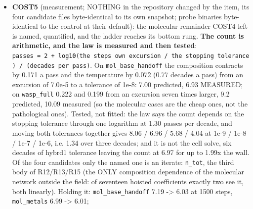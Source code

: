 \documentclass[english,a4paper]{my_memo}
\begin{document}
\begin{itemize}
{  remainder, now open item 1}: on \texttt{mol\_base\_handoff} the ladder is flat
  (freezing the field RAISES the count 7.19 -\textgreater{} 7.41) and everything the item
  could reach accounts for 0.6 of its 7.19 passes; the named candidate, READ
  and not measured, is \texttt{n\_tot}, the third-body density of the three-body
  molecular reactions, built by \texttt{calc\_ntot} from the ENTRY composition, and
  with it the H2 vibrational quench fraction and bound energy. Also
  recorded: \texttt{xuv\_field\_block\_cells} and \texttt{xuv\_self\_field\_passes} are
  compile-time parameters, so measuring the two together needs a rebuild;
  \texttt{heating\_of\_composition} calls \texttt{he\_rec\_coupling} a second time whole-grid
  every pass for its heating alone (both calls together bounded at 1.7
  percent of wall); on \texttt{mol\_base\_handoff} the He recombination coupling is
  what keeps step 0 inside the pass cap.
\item
  \textbf{COST5} (measurement; NOTHING in the repository changed by the item, its
  four candidate files byte-identical to its own snapshot; probe binaries
  byte-identical to the control at their default): the molecular remainder
  COST4 left is named, quantified, and the ladder reaches its bottom rung.
  \textbf{The count is arithmetic, and the law is measured and then tested}:
  \texttt{passes\ =\ 2\ +\ log10(the\ step\textquotesingle{}s\ own\ excursion\ /\ the\ stopping\ tolerance)\ /\ (decades\ per\ pass)}. On \texttt{mol\_base\_handoff} the composition contracts by
  0.171 a pass and the temperature by 0.072 (0.77 decades a pass) from an
  excursion of 7.0e-5 to a tolerance of 1e-8: 7.00 predicted, 6.93 MEASURED;
  on \texttt{wasp\_full} 0.222 and 0.199 from an excursion seven times larger, 9.2
  predicted, 10.09 measured (so the molecular cases are the cheap ones, not
  the pathological ones). Tested, not fitted: the law says the count depends
  on the stopping tolerance through one logarithm at 1.30 passes per decade,
  and moving both tolerances together gives 8.06 / 6.96 / 5.68 / 4.04 at
  1e-9 / 1e-8 / 1e-7 / 1e-6, i.e. 1.34 over three decades; and it is not the
  cell solve, six decades of hybrd1 tolerance leaving the count at 6.97 for
  up to 1.99x the wall. Of the four candidates only the named one is an
  iterate: \texttt{n\_tot}, the third body of R12/R13/R15 (the ONLY composition
  dependence of the molecular network outside the field: of seventeen
  hoisted coefficients exactly two see it, both linearly). Holding it:
  \texttt{mol\_base\_handoff} 7.19 -\textgreater{} 6.03 at 1500 steps, \texttt{mol\_metals} 6.99 -\textgreater{} 6.01;

\end{itemize}
\end{document}
